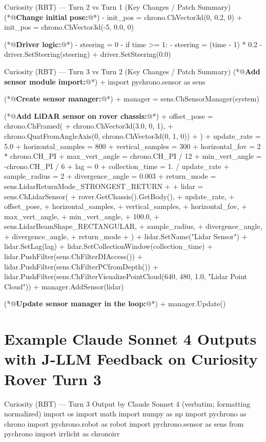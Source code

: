 \documentclass{ieeeaccess}
\begin{document}
\begin{appendices}
\begin{DiffBlock}{Curiosity (RBT) --- Turn 2 vs Turn 1 (Key Changes / Patch Summary)}
    (*@\textbf{Change initial pose:}@*)
    - init_pos = chrono.ChVector3d(0, 0.2, 0)
    + init_pos = chrono.ChVector3d(-5, 0.0, 0)
    
    (*@\textbf{Driver logic:}@*)
    - steering = 0
    - if time >= 1:
    -     steering = (time - 1) * 0.2
    - driver.SetSteering(steering)
    + driver.SetSteering(0.0)
    \end{DiffBlock}
    
    
    \begin{DiffBlock}{Curiosity (RBT) --- Turn 3 vs Turn 2 (Key Changes / Patch Summary)}
    (*@\textbf{Add sensor module import:}@*)
    + import pychrono.sensor as sens
    
    (*@\textbf{Create sensor manager:}@*)
    + manager = sens.ChSensorManager(system)
    
    (*@\textbf{Add LiDAR sensor on rover chassis:}@*)
    + offset_pose = chrono.ChFramed(
    +     chrono.ChVector3d(3.0, 0, 1),
    +     chrono.QuatFromAngleAxis(0, chrono.ChVector3d(0, 1, 0))
    + )
    + update_rate = 5.0
    + horizontal_samples = 800
    + vertical_samples = 300
    + horizontal_fov = 2 * chrono.CH_PI
    + max_vert_angle = chrono.CH_PI / 12
    + min_vert_angle = -chrono.CH_PI / 6
    + lag = 0
    + collection_time = 1. / update_rate
    + sample_radius = 2
    + divergence_angle = 0.003
    + return_mode = sens.LidarReturnMode_STRONGEST_RETURN
    +
    + lidar = sens.ChLidarSensor(
    +     rover.GetChassis().GetBody(),
    +     update_rate,
    +     offset_pose,
    +     horizontal_samples,
    +     vertical_samples,
    +     horizontal_fov,
    +     max_vert_angle,
    +     min_vert_angle,
    +     100.0,
    +     sens.LidarBeamShape_RECTANGULAR,
    +     sample_radius,
    +     divergence_angle,
    +     divergence_angle,
    +     return_mode
    + )
    + lidar.SetName("Lidar Sensor")
    + lidar.SetLag(lag)
    + lidar.SetCollectionWindow(collection_time)
    + lidar.PushFilter(sens.ChFilterDIAccess())
    + lidar.PushFilter(sens.ChFilterPCfromDepth())
    + lidar.PushFilter(sens.ChFilterVisualizePointCloud(640, 480, 1.0, "Lidar Point Cloud"))
    + manager.AddSensor(lidar)
    
    (*@\textbf{Update sensor manager in the loop:}@*)
    + manager.Update()
    \end{DiffBlock}

    \section{Example Claude Sonnet 4 Outputs with J-LLM Feedback on Curiosity Rover Turn 3}
    \label{app:claude_curiosity_turn3}
    \begin{CodeBlock}[breakable]{Curiosity (RBT) --- Turn 3 Output by Claude Sonnet 4 (verbatim; formatting normalized)}
      import os
      import math
      import numpy as np
      import pychrono as chrono
      import pychrono.robot as robot
      import pychrono.sensor as sens
      from pychrono import irrlicht as chronoirr
      

\end{CodeBlock}
\end{appendices}
\end{document}
